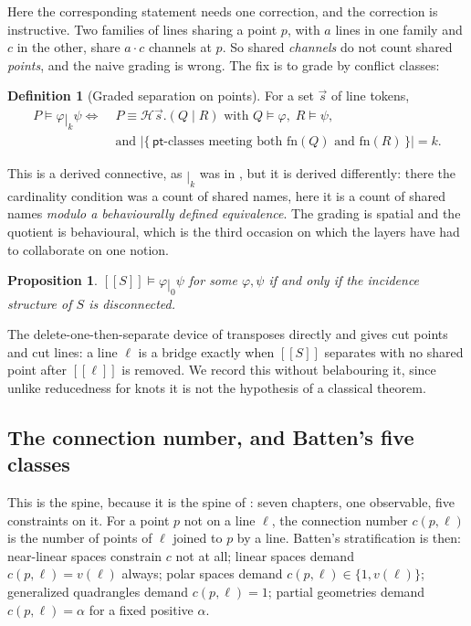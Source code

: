 \documentclass[11pt]{article}
\theoremstyle{plain}
\newtheorem{proposition}[theorem]{Proposition}
\theoremstyle{definition}
\newtheorem{definition}[theorem]{Definition}
\newcommand{\enc}[1]{[\![#1]\!]}
\newcommand{\bmid}{\mathbin{|}}
\newcommand{\pt}{\mathsf{pt}}
\begin{document}
Here the corresponding statement needs one correction, and the correction is instructive. Two
families of lines sharing a point $p$, with $a$ lines in one family and $c$ in the other, share
$a\cdot c$ channels at $p$. So shared \emph{channels} do not count shared \emph{points}, and the
naive grading is wrong. The fix is to grade by conflict classes:

\begin{definition}[Graded separation on points]
For a set $\vec{s}$ of line tokens,
\begin{align*}
P \models \varphi \bmid_k \psi \iff\;
&P \equiv \mathcal{H}\vec{s}.(Q \bmid R) \text{ with } Q \models \varphi,\; R \models \psi,\\
&\text{and } \bigl| \{\,\pt\text{-classes meeting both } \mathrm{fn}(Q)
\text{ and } \mathrm{fn}(R) \,\} \bigr| = k .
\end{align*}
\end{definition}

This is a derived connective, as $\bmid_k$ was in \cite[\S2.3.2]{Classifier}, but it is derived
differently: there the cardinality condition was a count of shared names, here it is a count of
shared names \emph{modulo a behaviourally defined equivalence}. The grading is spatial and the
quotient is behavioural, which is the third occasion on which the layers have had to collaborate on
one notion.

\begin{proposition}
$\enc{S} \models \varphi \bmid_0 \psi$ for some $\varphi,\psi$ if and only if the incidence
structure of $S$ is disconnected.
\end{proposition}

The delete-one-then-separate device of \cite[Prop.~1]{Classifier} transposes directly and gives cut
points and cut lines: a line $\ell$ is a bridge exactly when $\enc{S}$ separates with no shared
point after $\enc{\ell}$ is removed. We record this without belabouring it, since unlike
reducedness for knots it is not the hypothesis of a classical theorem.

\subsection{The connection number, and Batten's five classes}
\label{sec:conn}

This is the spine, because it is the spine of \cite{Batten}: seven chapters, one observable, five
constraints on it. For a point $p$ not on a line $\ell$, the connection number $c(p,\ell)$ is the
number of points of $\ell$ joined to $p$ by a line. Batten's stratification is then:
near-linear spaces constrain $c$ not at all; linear spaces demand $c(p,\ell)=v(\ell)$ always;
polar spaces demand $c(p,\ell) \in \{1, v(\ell)\}$; generalized quadrangles demand $c(p,\ell)=1$;
partial geometries demand $c(p,\ell)=\alpha$ for a fixed positive $\alpha$.
\end{document}

